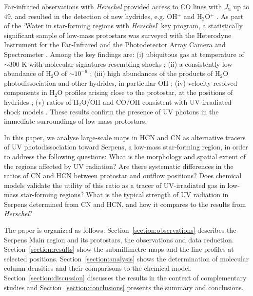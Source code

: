 \documentclass{aa}
\begin{document}
Far-infrared observations with \textit{Herschel} provided access to CO lines with $J_\mathrm{u}$ up to 49,
and resulted in the detection of new hydrides, e.g. OH$^+$ \citep{Wyr10} and 
H$_2$O$^{+}$ \citep{Oss10}. As part of the `Water in star-forming regions with \textit{Herschel}' 
\citep[WISH,][]{vDi11} key program, a statistically significant sample of low-mass protostars 
was surveyed with the Heterodyne Instrument for the Far-Infrared \citep[HIFI,][]{dGr10} 
and the Photodetector Array Camera and Spectrometer \citep[PACS,][]{Pog10}. Among the key 
findings are: (i) ubiquitous gas at temperature of $\sim$300 K with molecular signatures
resembling shocks \citep{Her12,Goi12,Kar13,Kar18}; (ii) a consistently low abundance of H$_2$O of $\sim$$10^{-6}$ \citep{Kri17}; 
(iii) high abundances of the products of H$_2$O photodissociation and other hydrides, in particular OH \citep{Wam13,Ben16}; 
(iv) velocity-resolved components in H$_2$O profiles arising close to the protostar, at the 
positions of hydrides \citep{Kri13}; (v) ratios of H$_2$O/OH and CO/OH consistent with UV-irradiated shock models \citep{Kar18}.
These results confirm the presence of UV photons in the immediate surroundings 
of low-mass protostars. 

In this paper, we analyse large-scale maps in HCN and CN as alternative tracers of UV 
photodissociation toward Serpens, a low-mass star-forming region, in order to address the following 
questions: What is the morphology and spatial extent of the regions affected by UV radiation? 
Are there systematic differences in the ratios of CN and HCN between protostar and outflow positions? 
Does chemical models validate the utility of this ratio as a tracer of UV-irradiated gas 
in low-mass star-forming regions? What is the typical strength of UV radiation in Serpens determined
from CN and HCN, and how it compares to the results from \textit{Herschel}? 

The paper is organized as follows: Section~\ref{section:observations} describes the Serpens Main region and its protostars, the observations and
data reduction. Section~\ref{section:results} show the submillimetre maps and the line profiles at selected positions.
Section~\ref{section:analysis} shows the determination of molecular column densities and their comparisons to the chemical model. Section~\ref{section:discussion} discusses the results in the context of complementary studies and 
Section~\ref{section:conclusions} presents the summary and conclusions. 

\end{document}
